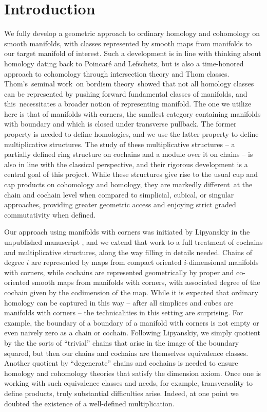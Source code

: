 
\section{Introduction}\label{S: introduction}

We fully develop a geometric approach to ordinary homology and cohomology on smooth manifolds, with classes represented by smooth maps from manifolds to our target manifold of interest.
Such a development is in line with thinking about homology dating back to Poincar\'e and Lefschetz, but is also a time-honored approach to cohomology through intersection theory and Thom classes.
Thom's seminal work on bordism theory showed that not all homology classes can be represented by pushing forward fundamental classes of manifolds, and this necessitates a broader notion of representing manifold.
The one we utilize here is that of manifolds with corners, the smallest category containing manifolds with boundary and which is closed under transverse pullback.
The former property is needed to define homologies, and we use the latter property to define multiplicative structures.
The study of these multiplicative structures -- a partially defined ring structure on cochains and a module over it on chains -- is also in line with the classical perspective, and their rigorous development is a central goal of this project.
While these structures give rise to the usual cup and cap products on cohomology and homology, they are markedly different at the chain and cochain level when compared to simplicial, cubical, or singular approaches, providing greater geometric access and enjoying strict graded commutativity when defined.

Our approach using manifolds with corners was initiated by Lipyanskiy in the unpublished manuscript \cite{Lipy14}, and we extend that work to a full treatment of cochains and multiplicative structures, along the way filling in details needed.
Chains of degree $i$ are represented by maps from compact oriented $i$-dimensional manifolds with corners, while cochains are represented geometrically by proper and co-oriented smooth maps from manifolds with corners, with associated degree of the cochain given by the codimension of the map.
While it is expected that ordinary homology can be captured in this way -- after all simplices and cubes are manifolds with corners -- the technicalities in this setting are surprising.
For example, the boundary of a boundary of a manifold with corners is not empty or even naively zero as a chain or cochain.
Following Lipyanskiy, we simply quotient by the the sorts of ``trivial'' chains that arise in the image of the boundary squared, but then our chains and cochains are themselves equivalence classes.
Another quotient by ``degenerate'' chains and cochains is needed to ensure homology and cohomology theories that satisfy the dimension axiom.
Once one is working with such equivalence classes and needs, for example, transversality to define products, truly substantial difficulties arise.
Indeed, at one point we doubted the existence of a well-defined multiplication.


